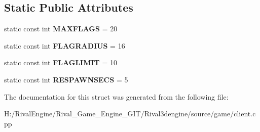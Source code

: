 \subsection*{Static Public Attributes}
\begin{DoxyCompactItemize}
\item 
\mbox{\label{structgame_1_1ctfclientmode_aa30e5bca0e905efaaafd4c8b22ffb7ef}} 
static const int {\bfseries M\+A\+X\+F\+L\+A\+GS} = 20
\item 
\mbox{\label{structgame_1_1ctfclientmode_a8fb6561710abe3b95a1e7837b2be95b5}} 
static const int {\bfseries F\+L\+A\+G\+R\+A\+D\+I\+US} = 16
\item 
\mbox{\label{structgame_1_1ctfclientmode_a7937424bdd8dad980a077b1177a596d5}} 
static const int {\bfseries F\+L\+A\+G\+L\+I\+M\+IT} = 10
\item 
\mbox{\label{structgame_1_1ctfclientmode_ab2a85b0a82554ef139149402af7250e7}} 
static const int {\bfseries R\+E\+S\+P\+A\+W\+N\+S\+E\+CS} = 5
\end{DoxyCompactItemize}


The documentation for this struct was generated from the following file\+:\begin{DoxyCompactItemize}
\item 
H\+:/\+Rival\+Engine/\+Rival\+\_\+\+Game\+\_\+\+Engine\+\_\+\+G\+I\+T/\+Rival3dengine/source/game/client.\+cpp\end{DoxyCompactItemize}
